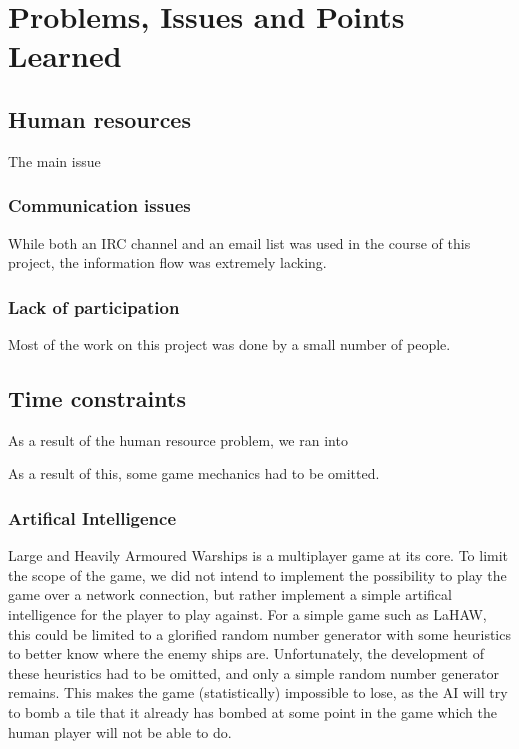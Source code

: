 \chapter{Problems, Issues and Points Learned}



\section{Human resources}
The main issue 

\subsection{Communication issues}
While both an IRC channel and an email list was used in the course of this project, the information flow was extremely lacking.

\subsection{Lack of participation}
Most of the work on this project was done by a small number of people.


\section{Time constraints}
As a result of the human resource problem, we ran into 


As a result of this, some game mechanics had to be omitted.

\subsection{Artifical Intelligence}
Large and Heavily Armoured Warships is a multiplayer game at its core. To limit the scope of the game, we did not intend to implement the possibility to play the game over a network connection, but rather implement a simple artifical intelligence for the player to play against. For a simple game such as LaHAW, this could be limited to a glorified random number generator with some heuristics to better know where the enemy ships are. Unfortunately, the development of these heuristics had to be omitted, and only a simple random number generator remains. This makes the game (statistically) impossible to lose, as the AI will try to bomb a tile that it already has bombed at some point in the game which the human player will not be able to do.


